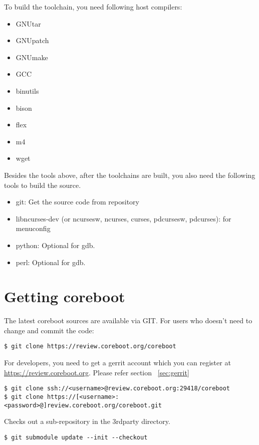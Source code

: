 \documentclass[titlepage,12pt]{article}
\begin{document}
To build the toolchain, you need following host compilers:

 \begin{itemize}
 \item GNUtar
 \item GNUpatch
 \item GNUmake
 \item GCC
 \item binutils
 \item bison
 \item flex
 \item m4
 \item wget
 \end{itemize}

Besides the tools above, after the toolchains are built, you also need the following
tools to build the source.

 \begin{itemize}
 \item git: Get the source code from repository
 \item libncurses-dev (or ncursesw, ncurses, curses, pdcursesw, pdcurses): for menuconfig
 \item python: Optional for gdb.
 \item perl: Optional for gdb.
 \end{itemize}

%
%

\section{Getting coreboot}
The latest coreboot sources are available via GIT.
For users who doesn't need to change and commit the code:
{ \small
\begin{verbatim}
$ git clone https://review.coreboot.org/coreboot
\end{verbatim}
}
For developers, you need to get a gerrit account which you can register
at \url{https://review.coreboot.org}. Please refer section ~\ref{sec:gerrit}
{ \small
\begin{verbatim}
$ git clone ssh://<username>@review.coreboot.org:29418/coreboot
$ git clone https://[<username>:<password>@]review.coreboot.org/coreboot.git
\end{verbatim}
}

Checks out a sub-repository in the 3rdparty directory.
{ \small
\begin{verbatim}
$ git submodule update --init --checkout
\end{verbatim}
}
\end{document}
